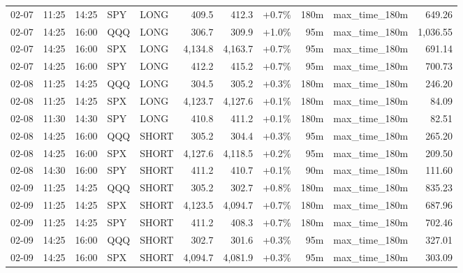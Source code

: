 \documentclass[11pt,a4paper,twoside]{article}
\begin{document}
\begin{center}
\begin{longtable}{>{\color{txtmain}}l l l l l r r r r >{\color{txtmain}}l r}
02-07 & 11:25 & 14:25 & SPY & LONG & 409.5 & 412.3 & \textcolor{wingreen}{+0.7\%} & 180m & max\_time\_180m & \textcolor{wingreen}{649.26} \\
02-07 & 14:25 & 16:00 & QQQ & LONG & 306.7 & 309.9 & \textcolor{wingreen}{+1.0\%} & 95m & max\_time\_180m & \textcolor{wingreen}{1,036.55} \\
02-07 & 14:25 & 16:00 & SPX & LONG & 4,134.8 & 4,163.7 & \textcolor{wingreen}{+0.7\%} & 95m & max\_time\_180m & \textcolor{wingreen}{691.14} \\
02-07 & 14:25 & 16:00 & SPY & LONG & 412.2 & 415.2 & \textcolor{wingreen}{+0.7\%} & 95m & max\_time\_180m & \textcolor{wingreen}{700.73} \\
02-08 & 11:25 & 14:25 & QQQ & LONG & 304.5 & 305.2 & \textcolor{wingreen}{+0.3\%} & 180m & max\_time\_180m & \textcolor{wingreen}{246.20} \\
02-08 & 11:25 & 14:25 & SPX & LONG & 4,123.7 & 4,127.6 & \textcolor{wingreen}{+0.1\%} & 180m & max\_time\_180m & \textcolor{wingreen}{84.09} \\
02-08 & 11:30 & 14:30 & SPY & LONG & 410.8 & 411.2 & \textcolor{wingreen}{+0.1\%} & 180m & max\_time\_180m & \textcolor{wingreen}{82.51} \\
02-08 & 14:25 & 16:00 & QQQ & SHORT & 305.2 & 304.4 & \textcolor{wingreen}{+0.3\%} & 95m & max\_time\_180m & \textcolor{wingreen}{265.20} \\
02-08 & 14:25 & 16:00 & SPX & SHORT & 4,127.6 & 4,118.5 & \textcolor{wingreen}{+0.2\%} & 95m & max\_time\_180m & \textcolor{wingreen}{209.50} \\
02-08 & 14:30 & 16:00 & SPY & SHORT & 411.2 & 410.7 & \textcolor{wingreen}{+0.1\%} & 90m & max\_time\_180m & \textcolor{wingreen}{111.60} \\
02-09 & 11:25 & 14:25 & QQQ & SHORT & 305.2 & 302.7 & \textcolor{wingreen}{+0.8\%} & 180m & max\_time\_180m & \textcolor{wingreen}{835.23} \\
02-09 & 11:25 & 14:25 & SPX & SHORT & 4,123.5 & 4,094.7 & \textcolor{wingreen}{+0.7\%} & 180m & max\_time\_180m & \textcolor{wingreen}{687.96} \\
02-09 & 11:25 & 14:25 & SPY & SHORT & 411.2 & 408.3 & \textcolor{wingreen}{+0.7\%} & 180m & max\_time\_180m & \textcolor{wingreen}{702.46} \\
02-09 & 14:25 & 16:00 & QQQ & SHORT & 302.7 & 301.6 & \textcolor{wingreen}{+0.3\%} & 95m & max\_time\_180m & \textcolor{wingreen}{327.01} \\
02-09 & 14:25 & 16:00 & SPX & SHORT & 4,094.7 & 4,081.9 & \textcolor{wingreen}{+0.3\%} & 95m & max\_time\_180m & \textcolor{wingreen}{303.09} \\

\end{longtable}
\end{center}
\end{document}
